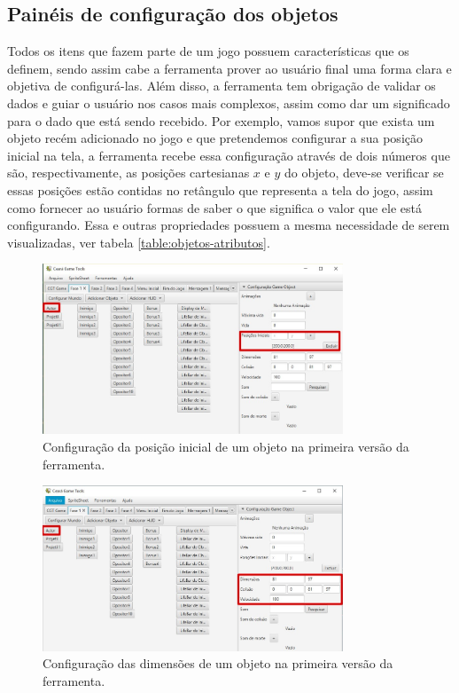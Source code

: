 \documentclass[12pt,oneside,openright,a4paper,english,brazil,sumario=tradicional]{abntex2}
\begin{document}
\subsection{Painéis de configuração dos objetos}
\label{sec:paineis-objetos}
Todos os itens que fazem parte de um jogo possuem características que os definem, sendo assim cabe a ferramenta prover ao usuário final uma forma clara e objetiva de configurá-las. Além disso, a ferramenta tem obrigação de validar os dados e guiar o usuário nos casos mais complexos, assim como dar um significado para o dado que está sendo recebido. Por exemplo, vamos supor que exista um objeto recém adicionado no jogo e que pretendemos configurar a sua posição inicial na tela, a ferramenta recebe essa configuração através de dois números que são, respectivamente, as posições cartesianas $x$ e $y$ do objeto, deve-se verificar se essas posições estão contidas no retângulo que representa a tela do jogo, assim como fornecer ao usuário formas de saber o que significa o valor que ele está configurando. Essa e outras propriedades possuem a mesma necessidade de serem visualizadas, ver tabela \ref{table:objetos-atributos}.

\begin{figure}[h]
\centering
\includegraphics[width=0.8\textwidth]{images/pos_inicial.jpg}
\caption{Configuração da posição inicial de um objeto na primeira versão da ferramenta.}
\label{fig:obj_pos_inicial}
\end{figure}

\begin{figure}[h]
\centering
\includegraphics[width=0.8\textwidth]{images/obj_dimensoes.jpg}
\caption{Configuração das dimensões de um objeto na primeira versão da ferramenta.}
\label{fig:obj_dimensoes}
\end{figure}
\end{document}
